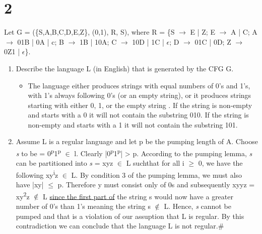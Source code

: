 \documentclass[11pt]{article}
\begin{document}
\section{2}
\label{sec:org3c0a438}
Let G = (\{S,A,B,C,D,E,Z\}, (0,1), R, S), where R = \{S \(\rightarrow\) E | Z; E \(\rightarrow\) A | C; A \(\rightarrow\) 01B | 0A | c; B \(\rightarrow\) 1B | 10A; C \(\rightarrow\) 10D | 1C | \(\epsilon\); D \(\rightarrow\) 01C | 0D; Z \(\rightarrow\) 0Z1 | \(\epsilon\)\}.
\begin{enumerate}
\item Describe the language L (in English) that is generated by the CFG G.
\begin{itemize}
\item The language either produces strings with equal numbers of 0's and 1's, with 1's always following 0's (or an empty string), or it produces strings starting with either 0, 1, or the empty string . If the string is non-empty and starts with a 0 it will not contain the substring 010. If the string is non-empty and starts with a 1 it will not contain the substring 101.
\end{itemize}
\item Assume L is a regular language and let p be the pumping length of A. Choose \emph{s} to be = 0\textsuperscript{p}1\textsuperscript{p} \(\in\) l. Clearly |0\textsuperscript{p}1\textsuperscript{p}| \textgreater{} p. According to the pumping lemma, \emph{s} can be partitioned into \emph{s} = xyz \(\in\) L suchthat for all i \(\ge\) 0, we have the following xy\textsuperscript{i}z \(\in\) L. By condition 3 of the pumping lemma, we must also have |xy| \(\le\) p. Therefore y must consist only of 0s and subsequently xyyz = xy\textsuperscript{2}z \(\notin\) L \uline{since the first part of} the string s would now have a greater number of 0's than 1's meaning the string s \(\notin\) L. Hence, \emph{s} cannot be pumped and that is a violation of our assuption that L is regular. By this contradiction we can conclude that the language L is not regular.\#
\end{enumerate}
\end{document}

